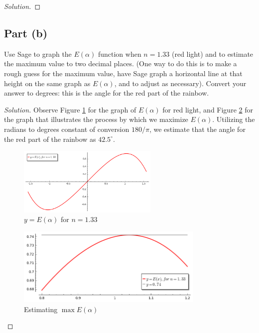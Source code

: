 \documentclass[letterpaper, 12pt]{amsart}
\theoremstyle{definition}  %
\begin{document}
		\begin{proof}[Solution]
		\end{proof}
		\pagebreak

		\subsection*{Part (b)}
		Use Sage to graph the $E(\alpha)$ function when $n = 1.33$ (red light) and to estimate the maximum value to two decimal places. 
		(One way to do this is to make a rough guess for the maximum value, have Sage graph a horizontal line at that height on the same graph as $E(\alpha)$, and to adjust as necessary). 
		Convert your answer to degrees: this is the angle for the red part of the rainbow.

		\begin{proof}[Solution]
		Observe Figure \ref{redGraph} for the graph of $E(\alpha)$ for red light, and Figure \ref{redMax} for the graph that illustrates the process by which we maximize $E(\alpha)$.
		Utilizing the radians to degrees constant of conversion $180/\pi$, we estimate that the angle for the red part of the rainbow as $42.5^{\circ}$.
			\begin{figure}[h]
				\includegraphics[width=0.6\textwidth]{figs/c.png}
				\caption{$y = E(\alpha)$ for $n = 1.33$}
				\label{redGraph}
			\end{figure}

			\begin{figure}[h]
				\includegraphics[width=0.8\textwidth]{figs/d.png}
				\caption{Estimating $\max E(\alpha)$}
				\label{redMax}
			\end{figure}
		\end{proof}
		\pagebreak
\end{document}
